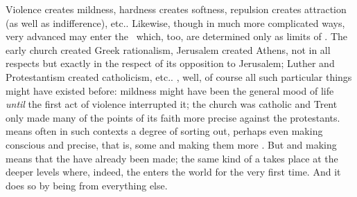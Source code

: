 Violence creates mildness, hardness creates softness, repulsion creates
attraction (as well as indifference), etc.. Likewise, though in much more
complicated ways, very advanced  may enter the \hoa\ which, too, are
determined only as limits of .  The early church created Greek
rationalism, Jerusalem created Athens, not in all respects but exactly in the
respect of its opposition to Jerusalem; Luther and Protestantism created
catholicism, etc..
, well, of course all such particular things might have existed
before: mildness might have been the general mood of life {\em until} the first
act of violence interrupted it; the church was catholic and Trent only made many
of the points of its faith more precise against the protestants. 
means often in such contexts a degree of sorting out, perhaps even making
conscious and precise, that is,  some  and
making them more . But  and making
 means that the  have already been made; the same
kind of  a  takes place at the deeper levels
where, indeed, the  enters the world for the very first time.
And it does so by being  from everything else.


